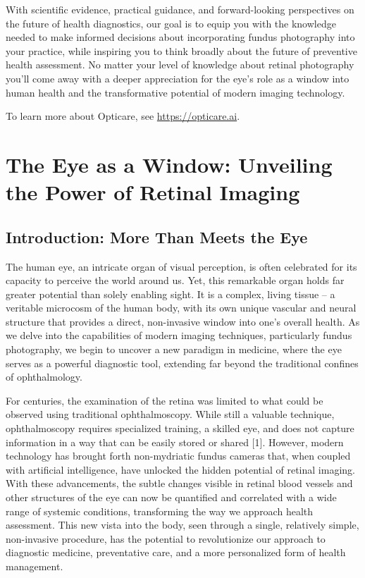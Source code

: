 \documentclass[
  Letterpaper,
]{scrbook}
\begin{document}
With scientific evidence, practical guidance, and forward-looking
perspectives on the future of health diagnostics, our goal is to equip
you with the knowledge needed to make informed decisions about
incorporating fundus photography into your practice, while inspiring you
to think broadly about the future of preventive health assessment. No
matter your level of knowledge about retinal photography you'll come
away with a deeper appreciation for the eye's role as a window into
human health and the transformative potential of modern imaging
technology.

To learn more about Opticare, see \url{https://opticare.ai}.


\chapter{The Eye as a Window: Unveiling the Power of Retinal
Imaging}\label{the-eye-as-a-window-unveiling-the-power-of-retinal-imaging}

\section{Introduction: More Than Meets the
Eye}\label{introduction-more-than-meets-the-eye}

The human eye, an intricate organ of visual perception, is often
celebrated for its capacity to perceive the world around us. Yet, this
remarkable organ holds far greater potential than solely enabling sight.
It is a complex, living tissue -- a veritable microcosm of the human
body, with its own unique vascular and neural structure that provides a
direct, non-invasive window into one's overall health. As we delve into
the capabilities of modern imaging techniques, particularly fundus
photography, we begin to uncover a new paradigm in medicine, where the
eye serves as a powerful diagnostic tool, extending far beyond the
traditional confines of ophthalmology.

For centuries, the examination of the retina was limited to what could
be observed using traditional ophthalmoscopy. While still a valuable
technique, ophthalmoscopy requires specialized training, a skilled eye,
and does not capture information in a way that can be easily stored or
shared {[}1{]}. However, modern technology has brought forth
non-mydriatic fundus cameras that, when coupled with artificial
intelligence, have unlocked the hidden potential of retinal imaging.
With these advancements, the subtle changes visible in retinal blood
vessels and other structures of the eye can now be quantified and
correlated with a wide range of systemic conditions, transforming the
way we approach health assessment. This new vista into the body, seen
through a single, relatively simple, non-invasive procedure, has the
potential to revolutionize our approach to diagnostic medicine,
preventative care, and a more personalized form of health management.
\end{document}
